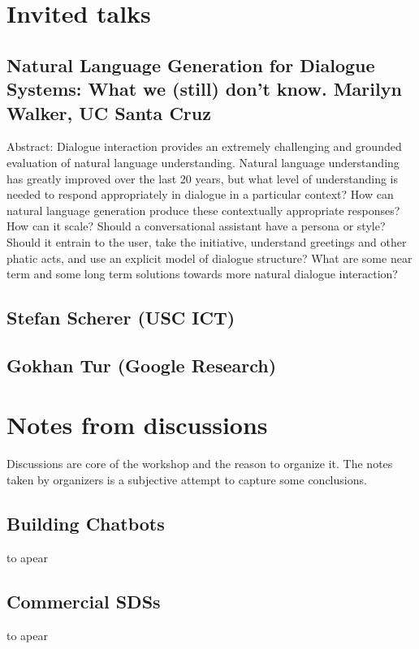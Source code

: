 \documentclass[12pt]{article}
\begin{document}

\tableofcontents
\pagebreak


\section{Invited talks}
\subsection{Natural Language Generation for Dialogue Systems: What we (still) don't know. Marilyn Walker, UC Santa Cruz}
Abstract:  Dialogue interaction provides an extremely challenging and grounded evaluation of natural language understanding. Natural language understanding has greatly improved over the last 20 years, but what level of understanding is needed to respond appropriately in dialogue in a particular context? How can natural language generation produce these contextually appropriate responses? How can it scale? Should a conversational assistant have a persona or style? Should it entrain to the user, take the initiative, understand greetings and other phatic acts, and use an explicit model of dialogue structure? What are some near term and some
long term solutions towards more natural dialogue interaction?

\subsection{Stefan Scherer (USC ICT)}
\subsection{Gokhan Tur (Google Research)}

\section{Notes from discussions}
Discussions are core of the workshop and the reason to organize it. 
The notes taken by organizers is a subjective attempt to capture some conclusions.

\subsection{Building Chatbots}
to apear
\subsection{Commercial SDSs}
to apear
\end{document}
